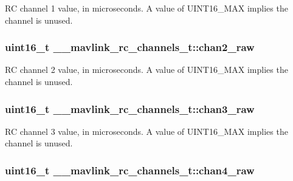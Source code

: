 R\+C channel 1 value, in microseconds. A value of U\+I\+N\+T16\+\_\+\+M\+A\+X implies the channel is unused. 

\hypertarget{struct____mavlink__rc__channels__t_a91f17bfc86bdc4338534a59208604379}{
\subsubsection[{chan2\+\_\+raw}]{\setlength{\rightskip}{0pt plus 5cm}uint16\+\_\+t \+\_\+\+\_\+mavlink\+\_\+rc\+\_\+channels\+\_\+t\+::chan2\+\_\+raw}}\label{struct____mavlink__rc__channels__t_a91f17bfc86bdc4338534a59208604379}


R\+C channel 2 value, in microseconds. A value of U\+I\+N\+T16\+\_\+\+M\+A\+X implies the channel is unused. 

\hypertarget{struct____mavlink__rc__channels__t_ab294506b06bd9c4cd0995024ca6aa8b7}{
\subsubsection[{chan3\+\_\+raw}]{\setlength{\rightskip}{0pt plus 5cm}uint16\+\_\+t \+\_\+\+\_\+mavlink\+\_\+rc\+\_\+channels\+\_\+t\+::chan3\+\_\+raw}}\label{struct____mavlink__rc__channels__t_ab294506b06bd9c4cd0995024ca6aa8b7}


R\+C channel 3 value, in microseconds. A value of U\+I\+N\+T16\+\_\+\+M\+A\+X implies the channel is unused. 

\hypertarget{struct____mavlink__rc__channels__t_aa636e5125264bada19518de805eb57ea}{
\subsubsection[{chan4\+\_\+raw}]{\setlength{\rightskip}{0pt plus 5cm}uint16\+\_\+t \+\_\+\+\_\+mavlink\+\_\+rc\+\_\+channels\+\_\+t\+::chan4\+\_\+raw}}\label{struct____mavlink__rc__channels__t_aa636e5125264bada19518de805eb57ea}


